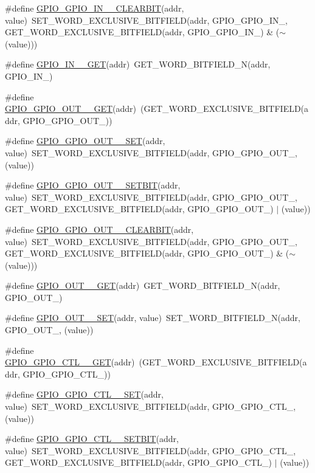 \begin{DoxyCompactItemize}
\#define \hyperlink{a00554_a172d09d6dbfd99dee72f389a7755d60b}{GPIO\_\-GPIO\_\-IN\_\_\-CLEARBIT}(addr, value)~SET\_\-WORD\_\-EXCLUSIVE\_\-BITFIELD(addr, GPIO\_\-GPIO\_\-IN\_, GET\_\-WORD\_\-EXCLUSIVE\_\-BITFIELD(addr, GPIO\_\-GPIO\_\-IN\_) \& ($\sim$(value)))
\item 
\#define \hyperlink{a00554_a931aaeeb4fbfe09f6eb5f0548dcf00fd}{GPIO\_\-IN\_\_\-GET}(addr)~GET\_\-WORD\_\-BITFIELD\_\-N(addr, GPIO\_\-IN\_)
\item 
\#define \hyperlink{a00554_aba15eb73d56286f89dde82a8b9931c09}{GPIO\_\-GPIO\_\-OUT\_\_\-GET}(addr)~(GET\_\-WORD\_\-EXCLUSIVE\_\-BITFIELD(addr, GPIO\_\-GPIO\_\-OUT\_))
\item 
\#define \hyperlink{a00554_a8de4d31c9d2174ae330b6734e26c1354}{GPIO\_\-GPIO\_\-OUT\_\_\-SET}(addr, value)~SET\_\-WORD\_\-EXCLUSIVE\_\-BITFIELD(addr, GPIO\_\-GPIO\_\-OUT\_, (value))
\item 
\#define \hyperlink{a00554_a747ae26d0c33b7c204e78f0011ae2500}{GPIO\_\-GPIO\_\-OUT\_\_\-SETBIT}(addr, value)~SET\_\-WORD\_\-EXCLUSIVE\_\-BITFIELD(addr, GPIO\_\-GPIO\_\-OUT\_, GET\_\-WORD\_\-EXCLUSIVE\_\-BITFIELD(addr, GPIO\_\-GPIO\_\-OUT\_) $|$ (value))
\item 
\#define \hyperlink{a00554_a9efe23554bcb3ac60be5cbfd77400f86}{GPIO\_\-GPIO\_\-OUT\_\_\-CLEARBIT}(addr, value)~SET\_\-WORD\_\-EXCLUSIVE\_\-BITFIELD(addr, GPIO\_\-GPIO\_\-OUT\_, GET\_\-WORD\_\-EXCLUSIVE\_\-BITFIELD(addr, GPIO\_\-GPIO\_\-OUT\_) \& ($\sim$(value)))
\item 
\#define \hyperlink{a00554_a081c82ab56265278d655b890985f8bac}{GPIO\_\-OUT\_\_\-GET}(addr)~GET\_\-WORD\_\-BITFIELD\_\-N(addr, GPIO\_\-OUT\_)
\item 
\#define \hyperlink{a00554_aa00a17df46d35ebc62d525b523084831}{GPIO\_\-OUT\_\_\-SET}(addr, value)~SET\_\-WORD\_\-BITFIELD\_\-N(addr, GPIO\_\-OUT\_, (value))
\item 
\#define \hyperlink{a00554_a0b4241efd03ed3d684cb5a8b16af7c81}{GPIO\_\-GPIO\_\-CTL\_\_\-GET}(addr)~(GET\_\-WORD\_\-EXCLUSIVE\_\-BITFIELD(addr, GPIO\_\-GPIO\_\-CTL\_))
\item 
\#define \hyperlink{a00554_a8df95853f01368614de94d998633ce5c}{GPIO\_\-GPIO\_\-CTL\_\_\-SET}(addr, value)~SET\_\-WORD\_\-EXCLUSIVE\_\-BITFIELD(addr, GPIO\_\-GPIO\_\-CTL\_, (value))
\item 
\#define \hyperlink{a00554_a52a04c8560281d3a0fd407f9b2e42672}{GPIO\_\-GPIO\_\-CTL\_\_\-SETBIT}(addr, value)~SET\_\-WORD\_\-EXCLUSIVE\_\-BITFIELD(addr, GPIO\_\-GPIO\_\-CTL\_, GET\_\-WORD\_\-EXCLUSIVE\_\-BITFIELD(addr, GPIO\_\-GPIO\_\-CTL\_) $|$ (value))

\end{DoxyCompactItemize}
